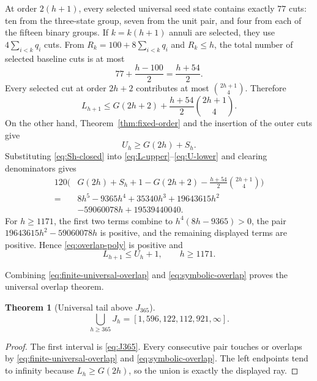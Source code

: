 \documentclass[11pt]{article}
\newtheorem{theorem}{Theorem}[section]
\theoremstyle{definition}
\theoremstyle{remark}
\newcommand{\C}[2]{\binom{#1}{#2}}
\newcommand{\interval}[2]{\left[#1,#2\right]}
\begin{document}
At order $2(h+1)$, every selected universal seed state contains exactly
$77$ cuts: ten from the three-state group, seven from the unit pair, and four
from each of the fifteen binary groups.  If $k=k(h+1)$ annuli are selected,
they use $4\sum_{i<k}q_i$ cuts.  From
$R_k=100+8\sum_{i<k}q_i$ and $R_k\le h$, the total number of selected
baseline cuts is at most
\begin{equation}\label{eq:cut-count-bound}
  77+\frac{h-100}{2}=\frac{h+54}{2}.
\end{equation}
Every selected cut at order $2h+2$ contributes at most
$\binom{2h+1}{4}$.  Therefore
\begin{equation}\label{eq:L-upper}
  L_{h+1}
  \le G(2h+2)+\frac{h+54}{2}\C{2h+1}{4}.
\end{equation}
On the other hand, Theorem~\ref{thm:fixed-order} and the insertion of the
outer cuts give
\begin{equation}\label{eq:U-lower}
  U_h\ge G(2h)+S_h.
\end{equation}
Substituting \eqref{eq:Sh-closed} into
\eqref{eq:L-upper}--\eqref{eq:U-lower} and clearing denominators gives
\begin{equation}\label{eq:overlap-poly}
\begin{split}
120\Biggl(&G(2h)+S_h+1-G(2h+2)
-\frac{h+54}{2}\C{2h+1}{4}\Biggr)\\
={}&8h^5-9365h^4+35340h^3+19643615h^2\\
&-59060078h+19539440040.
\end{split}
\end{equation}
For $h\ge1171$, the first two terms combine to
$h^4(8h-9365)>0$, the pair
$19643615h^2-59060078h$ is positive, and the remaining displayed terms are
positive.  Hence \eqref{eq:overlap-poly} is positive and
\begin{equation}\label{eq:symbolic-overlap}
  L_{h+1}\le U_h+1,
  \qquad h\ge1171.
\end{equation}

Combining \eqref{eq:finite-universal-overlap} and
\eqref{eq:symbolic-overlap} proves the universal overlap theorem.

\begin{theorem}[Universal tail above $J_{365}$]\label{thm:universal-tail}
\[
  \bigcup_{h\ge365}J_h
  =\interval{1{,}596{,}122{,}112{,}921}{\infty}.
\]
\end{theorem}

\begin{proof}
The first interval is \eqref{eq:J365}.  Every consecutive pair touches or
overlaps by \eqref{eq:finite-universal-overlap} and
\eqref{eq:symbolic-overlap}.  The left endpoints tend to infinity because
$L_h\ge G(2h)$, so the union is exactly the displayed ray.
\end{proof}
\end{document}
